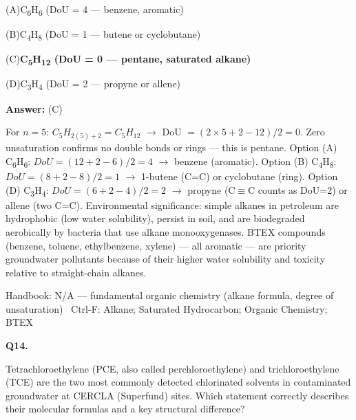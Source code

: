 \documentclass[11pt]{article}
\newcommand{\correct}[1]{\textbf{#1}\;{\color{accent}$\checkmark$}}
\newcommand{\optline}[2]{\par\noindent\hspace{1.2em}(#1)\hspace{0.6em}#2}
\begin{document}
\optline{A}{C\textsubscript{6}H\textsubscript{6}  (DoU = 4 --- benzene, aromatic)}
\optline{B}{C\textsubscript{4}H\textsubscript{8}  (DoU = 1 --- butene or cyclobutane)}
\optline{C}{\correct{C\textsubscript{5}H\textsubscript{1}\textsubscript{2}  (DoU = 0 --- pentane, saturated alkane)}}
\optline{D}{C\textsubscript{3}H\textsubscript{4}  (DoU = 2 --- propyne or allene)}
\par\vspace{3pt}
\vspace{2pt}\par\noindent\colorbox{boxbg}{\parbox{\dimexpr\linewidth-2\fboxsep\relax}{%
\vspace{2pt}\textbf{Answer:} (C)\par\vspace{2pt}
{\small For $n=5$: $C_5H_{2(5)+2} = C_5H_{12}$ $\rightarrow$ DoU $= (2\times5+2-12)/2 = 0$. Zero unsaturation confirms no double bonds or rings --- this is pentane. Option (A) C\textsubscript{6}H\textsubscript{6}: $DoU = (12+2-6)/2 = 4$ $\rightarrow$ benzene (aromatic). Option (B) C\textsubscript{4}H\textsubscript{8}: $DoU = (8+2-8)/2 = 1$ $\rightarrow$ 1-butene (C=C) or cyclobutane (ring). Option (D) C\textsubscript{3}H\textsubscript{4}: $DoU = (6+2-4)/2 = 2$ $\rightarrow$ propyne (C$\equiv$C counts as DoU=2) or allene (two C=C). Environmental significance: simple alkanes in petroleum are hydrophobic (low water solubility), persist in soil, and are biodegraded aerobically by bacteria that use alkane monooxygenases. BTEX compounds (benzene, toluene, ethylbenzene, xylene) --- all aromatic --- are priority groundwater pollutants because of their higher water solubility and toxicity relative to straight-chain alkanes.}\par\vspace{2pt}
{\footnotesize\color{soft}Handbook: N/A --- fundamental organic chemistry (alkane formula, degree of unsaturation) \textbullet\ Ctrl-F: Alkane; Saturated Hydrocarbon; Organic Chemistry; BTEX}\vspace{2pt}
}}
\vspace{9pt}
\filbreak
\textbf{\color{accent}Q14.}\par\vspace{2pt}
Tetrachloroethylene (PCE, also called perchloroethylene) and trichloroethylene (TCE) are the two most commonly detected chlorinated solvents in contaminated groundwater at CERCLA (Superfund) sites. Which statement correctly describes their molecular formulas and a key structural difference?\par\vspace{3pt}
\end{document}
